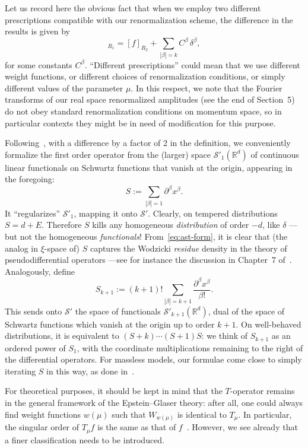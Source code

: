 \documentclass[a4paper,12pt]{article}
\makeatletter
\def\subsection{\@startsection{subsection}{2}{\z@}{-3.25ex plus -1ex
  minus -.2ex}{1.5ex plus .2ex}{\normalsize\bf}}
\renewcommand{\b}{\beta}           %
\newcommand{\del}{\partial}        %
\newcommand{\dl}{\delta}           %
\newcommand{\R}{\mathbb{R}}        %
\renewcommand{\SS}{\mathcal{S}}    %
\newcommand{\7}{\dagger}           %
\theoremstyle{plain}
\theoremstyle{definition}
\makeatother
\begin{document}
Let us record here the obvious fact that when we employ two different
prescriptions compatible with our renormalization scheme, the
difference in the results is given by
\begin{equation}
[f]_{R_1} = [f]_{R_2} + \sum_{|\b|=k} C^\b\,\dl^\b,
\label{eq:start-eq}
\end{equation}
for some constants $C^\b$. ``Different prescriptions'' could mean that
we use different weight functions, or different choices of
renormalization conditions, or simply different values of the parameter
$\mu$. In this respect, we note that the Fourier transforms of our
real space renormalized amplitudes (see the end of Section~5) do not
obey standard renormalization conditions on momentum space, so in
particular contexts they might be in need of modification for this
purpose.


\subsection{Supplementary remarks}
\label{sec:we-arrive}

Following~\cite{SmirZav}, with a difference by a factor of 2 in the
definition, we conveniently formalize the first order operator from
the (larger) space $\SS'_1(\R^d)$ of continuous linear functionals on
Schwartz functions that vanish at the origin, appearing in the
foregoing:
$$
S := \sum_{|\b|=1} \del^\b x^\b.
$$
It ``regularizes'' $\SS'_1$, mapping it onto $\SS'$. Clearly, on
tempered distributions $S = d + E$. Therefore $S$ kills any
homogeneous \textit{distribution} of order $-d$, like $\dl$ ---but not
the homogeneous \textit{functionals}! From~\eqref{eq:ast-form}, it is
clear that (the analog in $\xi$-space of) $S$ captures the Wodzicki
\textit{residue} density in the theory of pseudodifferential operators
---see for instance the discussion in Chapter~7 of~\cite{Polaris}.
Analogously, define
$$
S_{k+1} := (k+1)! \sum_{|\b|=k+1} \frac{\del^\b x^\b}{\b!}.
$$
This sends onto $\SS'$ the space of functionals $\SS'_{k+1}(\R^d)$,
dual of the space of Schwartz functions which vanish at the origin up
to order $k+1$. On well-behaved distributions, it is equivalent to
$(S+k)\cdots(S+1)S$: we think of $S_{k+1}$ as an ordered power of
$S_1$, with the coordinate multiplications remaining to the right of
the differential operators. For massless models, our formulae come
close to simply iterating $S$ in this way, as done in~\cite{SmirZav}.

For theoretical purposes, it should be kept in mind that the
$T$-operator remains in the general framework of the Epstein--Glaser
theory: after all, one could always find weight functions $w(\mu)$
such that $W_{w(\mu)}$ is identical to $T_\mu$. In particular, the
singular order of $T_\mu f$ is the same as that of $f$~\cite{BrFr}.
However, we see already that a finer classification needs to be
introduced.
\end{document}
